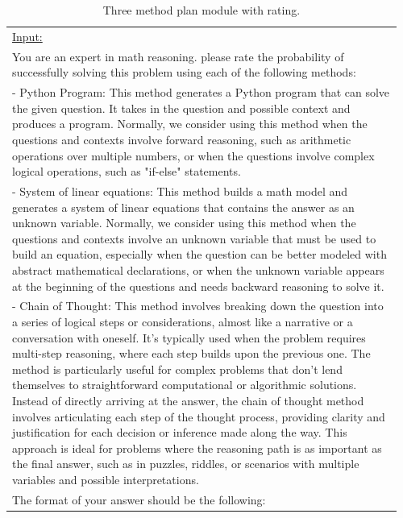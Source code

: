 \documentclass[10pt]{article} %
\begin{document}
          \begin{table}[t]
            \caption{Three method plan module with rating.}
            \label{tab:updated-plan-module}
            \begin{center}
            \begin{tabular}{|p{0.96\linewidth}|}
            \hline
            \underline{Input:}\\
            You are an expert in math reasoning. please rate the probability of successfully solving this problem using each of the following methods: \\
            - Python Program: This method generates a Python program that can solve the given question. It takes in the question and possible context and produces a program. Normally, we consider using this method when the questions and contexts involve forward reasoning, such as arithmetic operations over multiple numbers, or when the questions involve complex logical operations, such as "if-else" statements. \\
            - System of linear equations: This method builds a math model and generates a system of linear equations that contains the answer as an unknown variable. Normally, we consider using this method when the questions and contexts involve an unknown variable that must be used to build an equation, especially when the question can be better modeled with abstract mathematical declarations, or when the unknown variable appears at the beginning of the questions and needs backward reasoning to solve it. \\
            - Chain of Thought: This method involves breaking down the question into a series of logical steps or considerations, almost like a narrative or a conversation with oneself. It's typically used when the problem requires multi-step reasoning, where each step builds upon the previous one. The method is particularly useful for complex problems that don't lend themselves to straightforward computational or algorithmic solutions. Instead of directly arriving at the answer, the chain of thought method involves articulating each step of the thought process, providing clarity and justification for each decision or inference made along the way. This approach is ideal for problems where the reasoning path is as important as the final answer, such as in puzzles, riddles, or scenarios with multiple variables and possible interpretations. \\
            The format of your answer should be the following: \\

\end{tabular}
\end{center}
\end{table}
\end{document}

